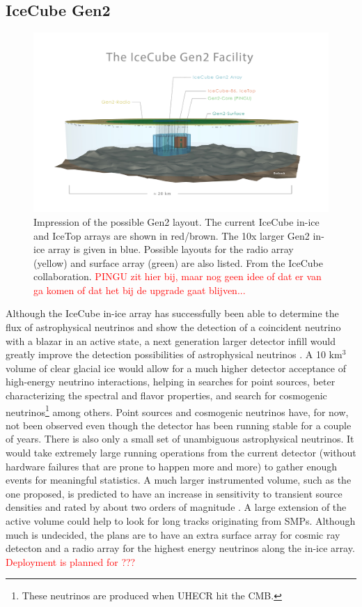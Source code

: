 \subsection{IceCube Gen2}
\begin{figure}[ht]
\centering
\includegraphics[width=\textwidth]{chapter5/img/gen2_structure.jpg}
\caption{Impression of the possible Gen2 layout. The current IceCube in-ice and IceTop arrays are shown in red/brown. The 10x larger Gen2 in-ice array is given in blue. Possible layouts for the radio array (yellow) and surface array (green) are also listed. From the IceCube collaboration. \textcolor{red}{PINGU zit hier bij, maar nog geen idee of dat er van ga komen of dat het bij de upgrade gaat blijven...}}
\label{fig:gen2}
\end{figure}

\noindent Although the IceCube in-ice array has successfully been able to determine the flux of astrophysical neutrinos and show the detection of a coincident neutrino with a blazar in an active state, a next generation larger detector infill would greatly improve the detection possibilities of astrophysical neutrinos \cite{Blaufuss:2015muc}. A 10 km$^3$ volume of clear glacial ice would allow for a much higher detector acceptance of high-energy neutrino interactions, helping in searches for point sources, beter characterizing the spectral and flavor properties, and search for cosmogenic neutrinos\footnote{These neutrinos are produced when UHECR hit the CMB.} among others. Point sources and cosmogenic neutrinos have, for now, not been observed even though the detector has been running stable for a couple of years. There is also only a small set of unambiguous astrophysical neutrinos. It would take extremely large running operations from the current detector (without hardware failures that are prone to happen more and more) to gather enough events for meaningful statistics. A much larger instrumented volume, such as the one proposed, is predicted to have an increase in sensitivity to transient source densities and rated by about two orders of magnitude \cite{Ahlers:2014ioa}. A large extension of the active volume could help to look for long tracks originating from SMPs. Although much is undecided, the plans are to have an extra surface array for cosmic ray detecton and a radio array for the highest energy neutrinos along the in-ice array.\\
\newline
\textcolor{red}{Deployment is planned for ???}

